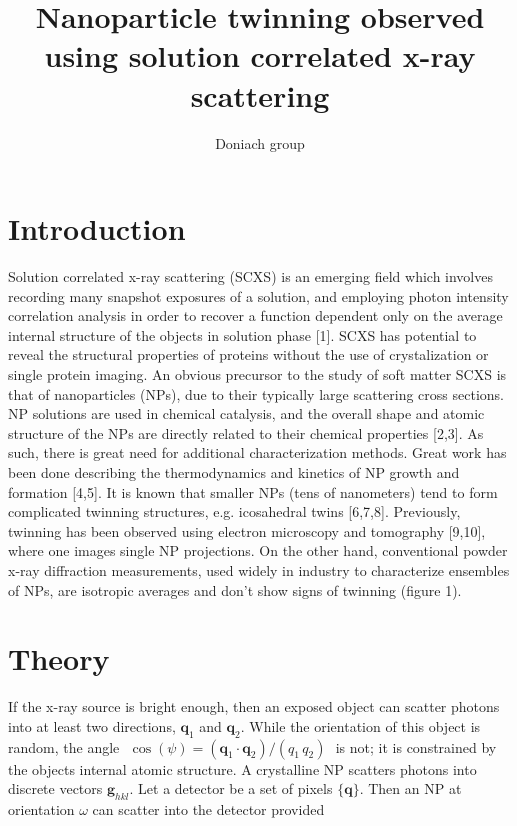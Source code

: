 \documentclass [11pt,fleqn]{article}
\title{Nanoparticle twinning observed using solution correlated x-ray scattering}
\author{Doniach group}
\date{}
\begin{document}
 
\maketitle

\delimitershortfall=-1pt




\section{Introduction}

Solution correlated x-ray scattering (SCXS) is an emerging field which involves recording many snapshot exposures of a solution, and employing photon intensity correlation analysis in order to recover a function dependent only on the average internal structure of the objects in solution phase [1]. SCXS has potential to reveal the structural properties of proteins without the use of crystalization or single protein imaging. An obvious precursor to the study of soft matter SCXS is that of nanoparticles (NPs), due to their typically large scattering cross sections. NP solutions are used in chemical catalysis, and the overall shape and atomic structure of the NPs are directly related to their chemical properties [2,3]. As such, there is great need for additional characterization methods. Great work has been done describing the thermodynamics and kinetics of NP growth and formation [4,5]. It is known that smaller NPs (tens of nanometers) tend to form complicated twinning structures, e.g. icosahedral twins [6,7,8]. Previously, twinning has been observed using electron microscopy and tomography [9,10], where one images single NP projections. On the other hand, conventional powder x-ray diffraction measurements, used widely in industry to characterize ensembles of NPs, are isotropic averages and don't show signs of twinning (figure 1).
 
\section{Theory}
If the x-ray source is bright enough, then an exposed object can scatter photons into at least two directions, $\bm q_1$ and $\bm q_2$. While the orientation of this object is random, the angle $\,\, \cos (\psi) = (\bm q_1 \cdot \bm q_2)/(q_1 \, q_2 )\,\,$ is not; it is constrained by the objects internal atomic structure. A crystalline NP scatters photons into discrete vectors $\bm g_{hkl}$. Let a detector be a set of pixels $\{\bm q\}$. Then an NP at orientation $\omega$ can scatter into the detector provided 
\end{document}
